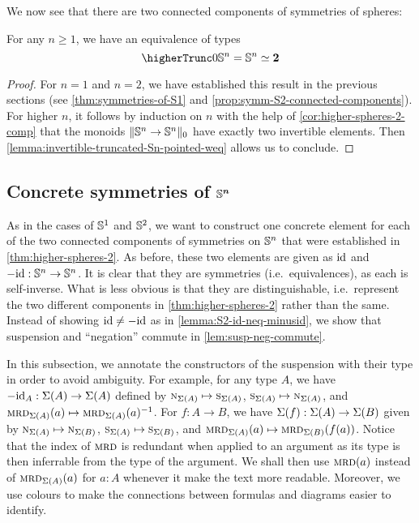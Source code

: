 \documentclass[english,a4paper]{lmcs}
\begin{document}
We now see that there are two connected components of symmetries of spheres:
\begin{thm} \label{thm:higher-spheres-2}
    For any $n \geq 1$, we have an equivalence of types
    \begin{equation}
    \higherTrunc 0 {\Sn n= \Sn n} \weq \bn 2
    \end{equation}
\end{thm}
\begin{proof}
  For $n = 1$ and $n=2$, we have established this result in the previous
  sections (see \cref{thm:symmetries-of-S1} and
  \cref{prop:symm-S2-connected-components}).  For higher $n$, it follows by
  induction on $n$ with the help of \cref{cor:higher-spheres-2-comp} that the
  monoids $\lVert{\mathbb S^{n}} \to {\mathbb S^{n}}\rVert_0$ have exactly two invertible elements.
  Then \cref{lemma:invertible-truncated-Sn-pointed-weq} allows us to conclude.
\end{proof}

\subsection{Concrete symmetries of \texorpdfstring{$\boldsymbol{{\mathbb S^{n}}}$}{Sn}}

As in the cases of ${{\mathbb S^{1}}}$ and ${{\mathbb S^{2}}}$, we want to construct one concrete element for each of the two connected components of symmetries on ${\mathbb S^{n}}$ that were established in \cref{thm:higher-spheres-2}.
As before, these two elements are given as $\mathord{\mathrm{id}}$ and $-\mathord{\mathrm{id}} : {\mathbb S^{n}} \to {\mathbb S^{n}}$.
It is clear that they are symmetries (i.e.\ equivalences), as each is self-inverse.
What is less obvious is that they are distinguishable, i.e.\ represent the two different components in \cref{thm:higher-spheres-2} rather than the same.
Instead of showing $\mathord{\mathrm{id}} \neq -\mathord{\mathrm{id}}$ as in \cref{lemma:S2-id-neq-minusid}, we show that suspension and ``negation'' commute in \cref{lem:susp-neg-commute}.

In this subsection, we annotate the constructors of the suspension with their type in order to avoid ambiguity.
For example, for any type $A$, we have $-\mathord{\mathrm{id}}_A : \operatorname{\Sigma}(A) \to \operatorname{\Sigma}(A)$ defined by
$\textsc{n}_{\operatorname{\Sigma}(A)} \mapsto \textsc{s}_{\operatorname{\Sigma}(A)}$,
$\textsc{s}_{\operatorname{\Sigma}(A)} \mapsto \textsc{n}_{\operatorname{\Sigma}(A)}$,
and $\operatorname{\textsc{mrd}}_{\operatorname{\Sigma}(A)}(a) \mapsto \operatorname{\textsc{mrd}}_{\operatorname{\Sigma}(A)}(a)^{-1}$.
For $f : A \to B$, we have $\operatorname{\Sigma}(f) : \operatorname{\Sigma}(A) \to \operatorname{\Sigma}(B)$ given by $\textsc{n}_{\operatorname{\Sigma}(A)} \mapsto \textsc{n}_{\operatorname{\Sigma}(B)}$,
$\textsc{s}_{\operatorname{\Sigma}(A)} \mapsto \textsc{s}_{\operatorname{\Sigma}(B)}$,
and $\operatorname{\textsc{mrd}}_{\operatorname{\Sigma}(A)}(a) \mapsto \operatorname{\textsc{mrd}}_{\operatorname{\Sigma}(B)}(f(a))$.
Notice that the index of $\operatorname{\textsc{mrd}}$ is redundant when applied to an argument as its type is then inferrable from the type of the argument. We shall then use $\operatorname{\textsc{mrd}}(a)$ instead of $\operatorname{\textsc{mrd}}_{\operatorname{\Sigma}(A)}(a)$ for $a:A$ whenever it make the text more readable.
Moreover, we use colours to make the connections between formulas and diagrams easier to identify.
\end{document}
